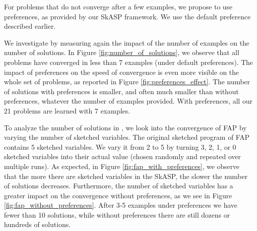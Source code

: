 For problems that do not converge after a few examples, we propose to 
use preferences, as provided by our SkASP framework. 
We use the default preference described earlier. 


We investigate \qtwo by  measuring again the impact of the number of examples 
on the number of solutions. 
In Figure \ref{fig:number_of_solutions}, we observe that all problems 
have converged in less than 7 examples (under default preferences). 
The impact of preferences on the speed 
of convergence is even more visible on the whole set of problems, as reported in 
Figure \ref{fig:preferences_effect}. 
The number of solutions with preferences is smaller, and often much smaller 
than without preferences, whatever the  
number of examples provided. 
With preferences, all our 21 problems are learned with 7 examples.  



To analyze the number of solutions in \qthree, we look into the convergence of FAP  
by varying the number of sketched variables. The original 
sketched program of FAP contains 5 sketched variables. 
We vary it from 2 to 5 by turning 3, 2, 1, or 0 sketched variables into 
their actual value (chosen randomly and repeated over multiple runs). As expected, in Figure \ref{fig:fap_with_preferences}, we observe that 
the more there are sketched variables in the SkASP, the slower the number 
of solutions decreases. Furthermore, the number of sketched variables has a greater impact on the convergence without preferences, as we see in Figure \ref{fig:fap_without_preferences}. After 3-5 examples under preferences we have fewer than 10 solutions, while without preferences there are still dozens or hundreds of solutions.


